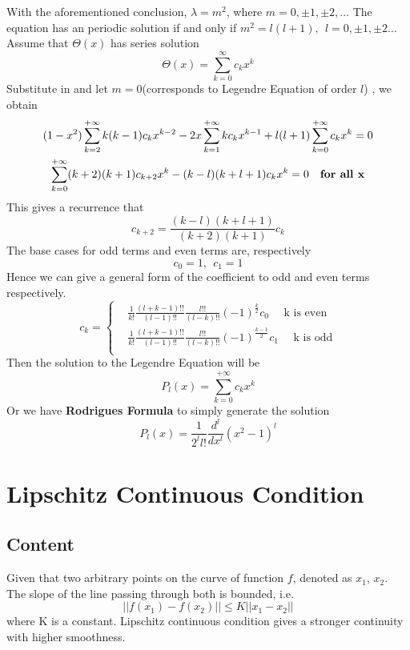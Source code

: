 \documentclass[25pt]{article}
\begin{document}
With the aforementioned conclusion, $\lambda = m^2$, where $m = 0, \pm1, \pm2, \dots$ The equation has an periodic solution if and only if $m^2 = l(l+1),~~l = 0, \pm1, \pm2 \dots $ Assume that $\Theta(x)$ has series solution
\begin{equation}
    \Theta(x) = \sum_{k=0}^{ \infty}c_k x^k
\end{equation}
Substitute in and let $m = 0$(corresponds to Legendre Equation of order $l$) , we obtain
\begin{gather}
    (1-x^2) \sum_{k=2}^{+\infty} k(k-1)c_k x^{k-2} -2x \sum_{k=1}^{+\infty}kc_k x^{k-1} + l(l+1) \sum_{k=0}^{+\infty}c_k x^k =0 \notag \\
    \sum_{k=0}^{+\infty} (k+2)(k+1)c_{k+2}x^k -(k-l)(k+l+1)c_kx^k = 0~~~\text{\textbf{for all x}}
\end{gather}
This gives a recurrence that
\begin{equation}
    c_{k+2} = \frac{(k-l)(k+l+1)}{(k+2)(k+1)}c_{k}
\end{equation}
The base cases for odd terms and even terms are, respectively
\begin{equation}
    c_0 = 1,~~c_1 = 1
\end{equation}
Hence we can give a general form of the coefficient to odd and even terms respectively.
\begin{equation}
c_k = \left\{
\begin{aligned}
    &\frac{1}{k!}\frac{(l+k-1)!!}{(l-1)!!}\frac{l!!}{(l-k)!!}(-1)^{\frac{k}{2}}c_0~~~~~~\text{k is even}\\
    &\frac{1}{k!}\frac{(l+k-1)!!}{(l-1)!!}\frac{l!!}{(l-k)!!}(-1)^{\frac{k-1}{2}}c_1~~~~~~\text{k is odd} \\
\end{aligned}
\right.
\end{equation}
Then the solution to the Legendre Equation will be
\begin{equation}
    P_{l}(x) = \sum_{k=0}^{+\infty}c_k x^k
\end{equation}
Or we have \textbf{Rodrigues Formula} to simply generate the solution
\begin{equation}
    P_{l}(x) = \frac{1}{2^l l!}\frac{d^l}{dx^l}(x^2-1)^l
\end{equation}
\section{Lipschitz Continuous Condition}
\subsection{Content}
Given that two arbitrary points on the curve of function $f$, denoted as $x_1$, $x_2$. The slope of the line passing through both is bounded, i.e.
\begin{equation}
    ||f(x_1)-f(x_2)|| \leq K||x_1-x_2||
\end{equation}
where K is a constant. Lipschitz continuous condition gives a stronger continuity with higher smoothness.
\end{document}

